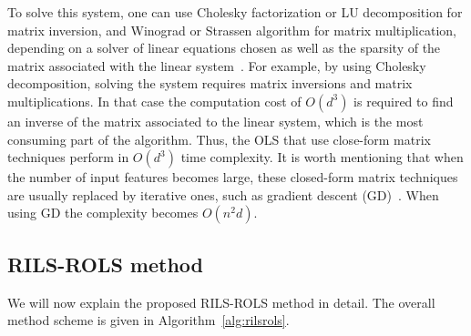 \documentclass{bmcart}
\begin{document}
To solve this system, one can use Cholesky  factorization or LU decomposition for matrix inversion, and Winograd or Strassen algorithm for matrix multiplication, depending on a solver of linear equations chosen as well as the sparsity of the matrix associated with the linear system~\cite{krishnamoorthy2013matrix}. For example, by using Cholesky decomposition, solving the system requires matrix inversions and matrix multiplications. In that case the computation cost of $O(d^3)$ is required to find an inverse of the matrix associated to the linear system, which is the most consuming part of the algorithm. Thus, the OLS that use close-form matrix techniques perform in $O(d^3)$ time complexity.  %
It is worth mentioning that when the number of input features becomes large, these closed-form matrix techniques are usually replaced by iterative ones, such as gradient descent (GD)~\cite{andrychowicz2016learning}. When using GD the complexity becomes $O(n^2d )$.


\subsection{\textsc{RILS}-\textsc{ROLS}  method}
We will now explain the proposed \textsc{RILS}-\textsc{ROLS} method in detail. The overall method scheme is given in Algorithm~\ref{alg:rilsrols}.   
\end{document}
